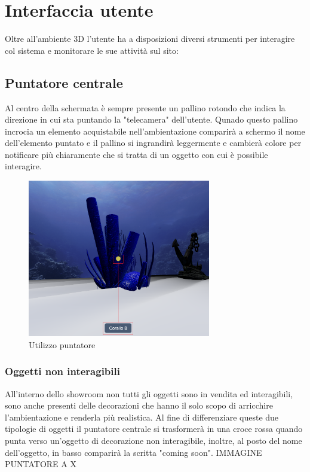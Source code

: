 \section{Interfaccia utente}
Oltre all'ambiente 3D l'utente ha a disposizioni diversi strumenti per interagire col sistema e monitorare le sue attività sul sito:
\subsection{Puntatore centrale}
Al centro della schermata è sempre presente un pallino rotondo che indica la direzione in cui sta puntando la "telecamera" dell'utente. Qunado questo pallino incrocia un elemento acquistabile nell'ambientazione comparirà a schermo il nome dell'elemento puntato e il pallino si ingrandirà leggermente e cambierà colore per notificare più chiaramente che si tratta di un oggetto con cui è possibile interagire.
\begin{figure}
  \renewcommand{\thefigure}{1}
\begin{center}
  \includegraphics[width=8cm]{./res/images/puntatore.png}
 \end{center}
 \caption{Utilizzo puntatore}
  \label{Utilizzo puntatore}
\end{figure}

\subsubsection{Oggetti non interagibili}
All'interno dello showroom non tutti gli oggetti sono in vendita ed interagibili, sono anche presenti delle decorazioni che hanno il solo scopo di arricchire l'ambientazione e renderla più realistica.
Al fine di differenziare queste due tipologie di oggetti il puntatore centrale si trasformerà in una croce rossa quando punta verso un'oggetto di decorazione non interagibile, inoltre, al posto del nome dell'oggetto, in basso comparirà la scritta "coming soon".
IMMAGINE PUNTATORE A X

